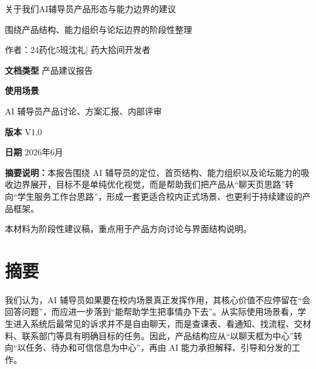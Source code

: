 \documentclass[12pt,a4paper]{ctexart}
\newcommand{\summarybox}[1]{%
  \noindent
  \colorbox{SoftBlue}{%
    \parbox{\dimexpr\linewidth-2\fboxsep-8pt\relax}{\raggedright #1}
  }%
}
\begin{document}
\begin{titlepage}
  \thispagestyle{empty}
  \vspace*{2.8cm}

  {\centering
  {\fontsize{19pt}{27pt}\selectfont\bfseries\color{TitleBlue}\parbox{0.96\linewidth}{\centering 关于我们AI辅导员产品形态与能力边界的建议}\par}
  \vspace{0.8cm}
  {\Large 围绕产品结构、能力组织与论坛边界的阶段性整理\par}
  \vspace{0.8cm}
  {\normalsize\color{TextGray} 作者：24药化5班\quad 沈礼\quad | \quad 药大拾间开发者\par}
  \vspace{1.6cm}
  }

  \noindent{\color{LineBlue}\rule{\linewidth}{1pt}}
  \vspace{0.5cm}

  {\color{black}
  \noindent\textbf{文档类型}\hspace{1.6em} 产品建议报告\par
  \noindent\textbf{使用场景}\hspace{1.6em} \parbox[t]{0.72\linewidth}{AI 辅导员产品讨论、方案汇报、内部评审}\par
  \noindent\textbf{版本}\hspace{3.2em} V1.0\par
  \noindent\textbf{日期}\hspace{3.2em} 2026年6月\par
  }

  \vfill

  \summarybox{\color{black}\textbf{摘要说明：}本报告围绕 AI 辅导员的定位、首页结构、能力组织以及论坛能力的吸收边界展开，目标不是单纯优化视觉，而是帮助我们把产品从“聊天页思路”转向“学生服务工作台思路”，形成一套更适合校内正式场景、也更利于持续建设的产品框架。}

  \vfill

  {\small\color{TextGray}
  本材料为阶段性建议稿，重点用于产品方向讨论与界面结构说明。}
\end{titlepage}


\section*{摘\quad 要}
我们认为，AI 辅导员如果要在校内场景真正发挥作用，其核心价值不应停留在“会回答问题”，而应进一步落到“能帮助学生把事情办下去”。从实际使用场景看，学生进入系统后最常见的诉求并不是自由聊天，而是查课表、看通知、找流程、交材料、联系部门等具有明确目标的任务。因此，产品结构应从“以聊天框为中心”转向“以任务、待办和可信信息为中心”，再由 AI 能力承担解释、引导和分发的工作。
\end{document}
